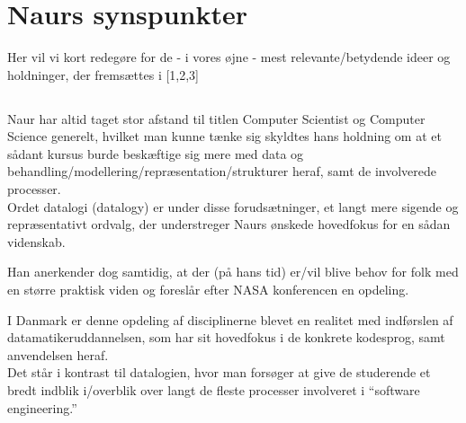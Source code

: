 \section{Naurs synspunkter}
Her vil vi kort redegøre for de - i vores øjne - mest relevante/betydende
ideer og holdninger, der fremsættes i [1,2,3]

\subsection{}
Naur har altid taget stor afstand til titlen Computer Scientist og Computer
Science generelt, hvilket man kunne tænke sig skyldtes hans holdning om at et
sådant kursus burde beskæftige sig mere med data og
behandling/modellering/repræsentation/strukturer heraf, samt de involverede
processer.\\
Ordet datalogi (datalogy) er under disse forudsætninger, et langt mere sigende
og repræsentativt ordvalg, der understreger Naurs ønskede hovedfokus for en
sådan videnskab.

Han anerkender dog samtidig, at der (på hans tid) er/vil blive behov for folk
med en større praktisk viden og foreslår efter NASA konferencen en opdeling.

I Danmark er denne opdeling af disciplinerne blevet en realitet med indførslen
af datamatikeruddannelsen, som har sit hovedfokus i de konkrete kodesprog, samt
anvendelsen heraf.\\
Det står i kontrast til datalogien, hvor man forsøger at give de studerende et
bredt indblik i/overblik over langt de fleste processer involveret i ``software engineering.''

